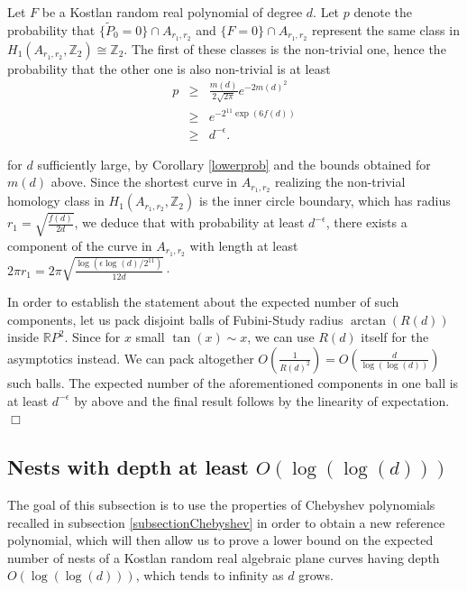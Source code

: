 \documentclass [11pt]{amsart}
\theoremstyle{remark}
\numberwithin{equation}{section}
\numberwithin{theorem}{section}
\begin{document}
Let $F$ be a Kostlan random real polynomial of degree $d$. Let $p$ denote the probability that $\{\widetilde{P}_{0}=0\}\cap A_{r_{1},r_{2}}$ and $\{F=0\}\cap A_{r_{1},r_{2}}$ represent the same class in $H_{1}(A_{r_{1}, r_{2}}, \mathbb{Z}_{2})\cong \mathbb{Z}_{2}$. The first of these classes is the non-trivial one, hence the probability that the other one is also non-trivial is at least 
\begin{eqnarray*} 
p&\geq& \frac{m(d)}{2\sqrt{2\pi}} e^{-2m(d)^2}\\
&\geq&e^{-2^{11}\exp(6f(d))} \\
&\geq& d^{-\epsilon}. 
\end{eqnarray*} 

\noindent for $d$ sufficiently large, by Corollary \ref{lowerprob}  and the bounds obtained for $m(d)$ above. Since the shortest curve in $A_{r_{1},r_{2}}$ realizing the non-trivial homology class in $H_{1}(A_{r_{1}, r_{2}}, \mathbb{Z}_{2})$ is the inner circle boundary, which has radius $\displaystyle{r_{1}=\sqrt{\frac{f(d)}{2d}}}$, we deduce that with probability at least $d^{-\epsilon}$, there exists a component of the curve in $A_{r_{1},r_{2}}$ with length at least $\displaystyle{2\pi r_{1}= 2\pi\sqrt{\frac{\log\left(\epsilon \log(d)/2^{11}\right)}{12d}}\cdot}$ 

In order to establish the statement about the expected number of such components, let us pack disjoint balls of Fubini-Study radius $\arctan(R(d))$ inside $\mathbb{R}P^2$. Since for $x$ small $\tan(x)\sim x$, we can use $R(d)$ itself for the asymptotics instead. We can pack altogether $\displaystyle{O\left( \frac{1}{R(d)^2}\right)=O\left(\frac{d}{\log(\log(d))}\right)}$ such balls. The expected number of the aforementioned components in one ball is at least $d^{-\epsilon}$ by above and the final result follows by the linearity of expectation. \hfill $\Box$


\subsection{Nests with depth at least $O(\log(\log(d)))$}  \label{Chebyshevimprove}
The goal of this subsection is to use the properties of Chebyshev polynomials recalled in subsection \ref{subsectionChebyshev} in order to obtain a new reference polynomial, which will then allow us to prove a lower bound on the expected number of nests of a  Kostlan random real algebraic plane curves having depth $O(\log(\log(d)))$, which tends to infinity as $d$ grows. 
\end{document}
